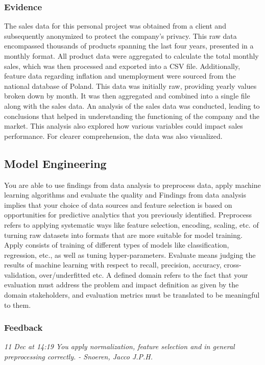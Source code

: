 \documentclass[a4paper, 11pt]{article}
\begin{document}
\subsubsection{Evidence}
The sales data for this personal project was obtained from a client and subsequently anonymized to protect the company's privacy. This raw data encompassed thousands of products spanning the last four years, presented in a monthly format. All product data were aggregated to calculate the total monthly sales, which was then processed and exported into a CSV file.
Additionally, feature data regarding inflation and unemployment were sourced from the national database of Poland. This data was initially raw, providing yearly values broken down by month. It was then aggregated and combined into a single file along with the sales data. An analysis of the sales data was conducted, leading to conclusions that helped in understanding the functioning of the company and the market. This analysis also explored how various variables could impact sales performance. For clearer comprehension, the data was also visualized.

\subsection{Model Engineering}
You are able to use findings from data analysis to preprocess data, apply machine learning algorithms and evaluate the quality and 
\medbreak
Findings from data analysis implies that your choice of data sources and feature selection is based on opportunities for predictive analytics that you previously identified. Preprocess refers to applying systematic ways like feature selection, encoding, scaling, etc. of turning raw datasets into formats that are more suitable for model training. Apply consists of training of different types of models like classification, regression, etc., as well as tuning hyper-parameters. Evaluate means judging the results of machine learning with respect to recall, precision, accuracy, cross-validation, over/underfitted etc. A defined domain refers to the fact that your evaluation must address the problem and impact definition as given by the domain stakeholders, and evaluation metrics must be translated to be meaningful to them.
\subsubsection{Feedback}

\begin{mdframed}[backgroundcolor=gray!20, linecolor=black, linewidth=0pt, leftmargin=1cm, rightmargin=1cm, innertopmargin=10pt, innerbottommargin=10pt]
  \itshape
  11 Dec at 14:19 \smallbreak
  You apply normalization, feature selection and in general preprocessing correctly.\smallbreak
- Snoeren, Jacco J.P.H.
\end{mdframed}
\end{document}
